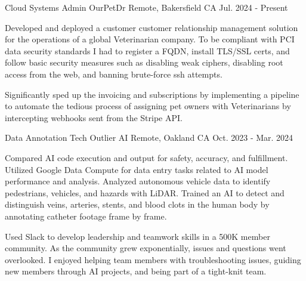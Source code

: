 

\begin{cventries}

  \cventry
    {Cloud Systems Admin} %
    {OurPetDr} %
    {Remote, Bakersfield CA} %
    {Jul. 2024 - Present} %
    {
      \begin{cvitems} %
		  \item {Developed and deployed a customer customer relationship management solution for the operations of a global Veterinarian company. To be compliant with PCI data security standards I had to register a FQDN, install TLS/SSL certs, and follow basic security measures such as disabling weak ciphers, disabling root access from the web, and banning brute-force ssh attempts. }
		  \item {Significantly sped up the invoicing and subscriptions by implementing a pipeline to automate the tedious process of assigning pet owners with Veterinarians by intercepting webhooks sent from the Stripe API.}
      \end{cvitems}
    }

  \cventry
    {Data Annotation Tech} %
    {Outlier AI} %
    {Remote, Oakland CA} %
    {Oct. 2023 - Mar. 2024} %
    {
      \begin{cvitems} %
		  \item {Compared AI code execution and output for safety, accuracy, and fulfillment. Utilized Google Data Compute for data entry tasks related to AI model performance and analysis. Analyzed autonomous vehicle data to identify pedestrians, vehicles, and hazards with LiDAR. Trained an AI to detect and distinguish veins, arteries, stents, and blood clots in the human body by annotating catheter footage frame by frame.}
		  \item {Used Slack to develop leadership and teamwork skills in a 500K member community. As the community grew exponentially, issues and questions went overlooked. I enjoyed helping team members with troubleshooting issues, guiding new members through AI projects, and being part of a tight-knit team.}
      \end{cvitems}
    }


\end{cventries}
